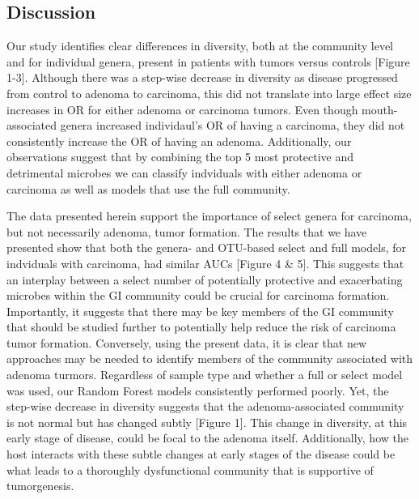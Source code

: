 \documentclass[12pt,]{article}
\begin{document}
\newpage

\subsection{Discussion}\label{discussion}

Our study identifies clear differences in diversity, both at the
community level and for individual genera, present in patients with
tumors versus controls {[}Figure 1-3{]}. Although there was a step-wise
decrease in diversity as disease progressed from control to adenoma to
carcinoma, this did not translate into large effect size increases in OR
for either adenoma or carcinoma tumors. Even though mouth-associated
genera increased individaul's OR of having a carcinoma, they did not
consistently increase the OR of having an adenoma. Additionally, our
observations suggest that by combining the top 5 most protective and
detrimental microbes we can classify indviduals with either adenoma or
carcinoma as well as models that use the full community.

The data presented herein support the importance of select genera for
carcinoma, but not necessarily adenoma, tumor formation. The results
that we have presented show that both the genera- and OTU-based select
and full models, for indviduals with carcinoma, had similar AUCs
{[}Figure 4 \& 5{]}. This suggests that an interplay between a select
number of potentially protective and exacerbating microbes within the GI
community could be crucial for carcinoma formation. Importantly, it
suggests that there may be key members of the GI community that should
be studied further to potentially help reduce the risk of carcinoma
tumor formation. Conversely, using the present data, it is clear that
new approaches may be needed to identify members of the community
associated with adenoma turmors. Regardless of sample type and whether a
full or select model was used, our Random Forest models consistently
performed poorly. Yet, the step-wise decrease in diversity suggests that
the adenoma-associated community is not normal but has changed subtly
{[}Figure 1{]}. This change in diversity, at this early stage of
disease, could be focal to the adenoma itself. Additionally, how the
host interacts with these subtle changes at early stages of the disease
could be what leads to a thoroughly dysfunctional community that is
supportive of tumorgenesis.
\end{document}
